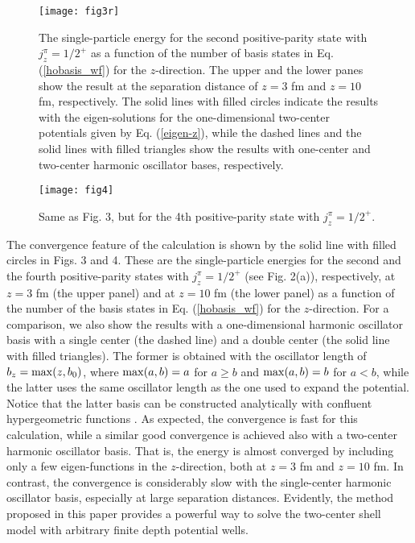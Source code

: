 \documentclass[superscriptaddress,twocolumn,amsmath,amssymb]{revtex4}
\begin{document}
\begin{figure}[tb]
\texttt{[image: fig3r]}
\caption{
The single-particle energy for the second positive-parity state with 
$j_z^\pi=1/2^+$ 
as a function of the number of basis states  in Eq. (\ref{hobasis_wf}) 
for the $z$-direction. 
The upper and the lower panes show the result at the 
separation distance of $z=3$ fm and $z=10$ fm, respectively. 
The solid lines with filled circles indicate the results with the 
eigen-solutions for the one-dimensional two-center potentials 
given by Eq. (\ref{eigen-z}), while the dashed lines and the solid lines with filled triangles 
show the results with one-center and two-center harmonic oscillator bases, respectively. }
\end{figure}

\begin{figure}[tb]
\texttt{[image: fig4]}
\caption{
Same as Fig. 3, but for the 4th positive-parity state with $j_z^\pi=1/2^+$.}
\end{figure}

The convergence feature of the calculation is shown by the 
solid line with filled circles in Figs. 3 and 4. These are the 
single-particle energies for the second and the fourth 
positive-parity states with $j_z^\pi=1/2^+$ (see Fig. 2(a)), respectively,
at $z=3$ fm (the upper panel) and at 
$z=10$ fm (the lower panel) as a function 
of the number of the basis states in 
Eq. (\ref{hobasis_wf}) for the $z$-direction. 
For a comparison, we also show 
the results with a one-dimensional harmonic 
oscillator basis with a single center (the dashed line) and a double center (the solid line 
with filled triangles). The former is obtained 
with the oscillator length of 
$b_z={\rm max}(z,b_0)$, where ${\rm max}(a,b)= a$ for $a\geq b$ and 
${\rm max}(a,b)= b$ for $a< b$, while the latter uses the same oscillator length as the one used to expand the 
potential. Notice that the latter basis can be constructed analytically 
with confluent hypergeometric functions \cite{HMG69}. 
As expected, the convergence is 
fast for this calculation, 
while a similar good convergence is achieved also 
with a two-center harmonic oscillator basis.
That is, the energy is almost converged by including 
only a few eigen-functions in the $z$-direction, both at $z=3$ fm and $z=10$ fm. 
In contrast, the convergence is considerably slow with the single-center harmonic 
oscillator basis, especially at large separation distances. 
Evidently, the method proposed in this paper provides a powerful 
way to solve the two-center shell model with arbitrary finite 
depth potential wells. 
\end{document}
